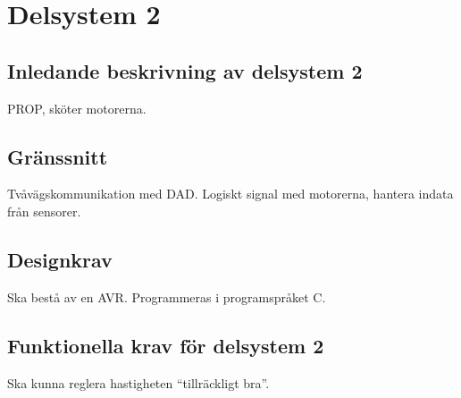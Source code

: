 \section{Delsystem 2}

\subsection{Inledande beskrivning av delsystem 2}
PROP, sköter motorerna.

\subsection{Gränssnitt}
Tvåvägskommunikation med DAD.
Logiskt signal med motorerna, hantera indata från sensorer.

\subsection{Designkrav}
Ska bestå av en AVR.
Programmeras i programspråket C.

\subsection{Funktionella krav för delsystem 2}
Ska kunna reglera hastigheten “tillräckligt bra”.
